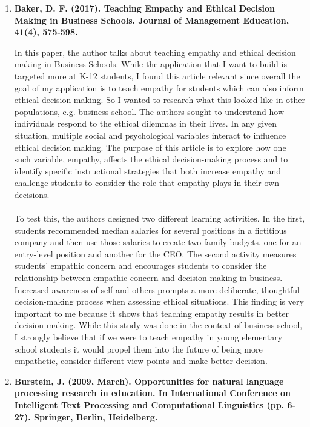 \documentclass[12pt, final]{article}
\begin{document}
\begin{enumerate}

\item \textbf{Baker, D. F. (2017). Teaching Empathy and Ethical Decision Making in Business Schools. Journal of Management Education, 41(4), 575-598.}

In this paper, the author talks about teaching empathy and ethical decision making in Business Schools. While the application that I want to build is targeted more at K-12 students, I found this article relevant since overall the goal of my application is to teach empathy for students which can also inform ethical decision making. So I wanted to research what this looked like in other populations, e.g. business school. The authors sought to understand how individuals respond to the ethical dilemmas in their lives. In any given situation, multiple social and psychological variables interact to influence ethical decision making. The purpose of this article is to explore how one such variable, empathy, affects the ethical decision-making process and to identify specific instructional strategies that both increase empathy and challenge students to consider the role that empathy plays in their own decisions.
\\
\\
To test this, the authors designed two different learning activities. In the first, students recommended median salaries for several positions in a fictitious company and then use those salaries to create two family budgets, one for an entry-level position and another for the CEO. The second activity measures students' empathic concern and encourages students to consider the relationship between empathic concern and decision making in business. Increased awareness of self and others prompts a more deliberate, thoughtful decision-making process when assessing ethical situations. This finding is very important to me because it shows that teaching empathy results in better decision making. While this study was done in the context of business school, I strongly believe that if we were to teach empathy in young elementary school students it would propel them into the future of being more empathetic, consider different view points and make better decision. 

\item \textbf{Burstein, J. (2009, March). Opportunities for natural language processing research in education. In International Conference on Intelligent Text Processing and Computational Linguistics (pp. 6-27). Springer, Berlin, Heidelberg.}


\end{enumerate}
\end{document}

